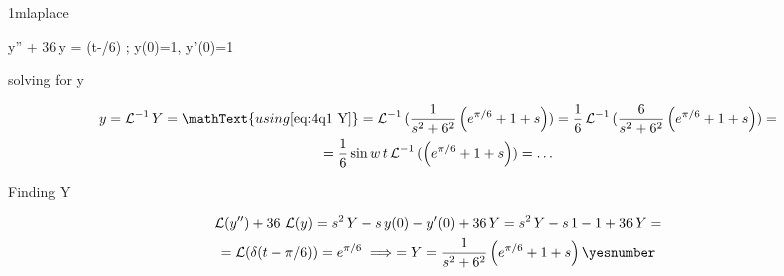\documentclass["AM3C-tests_resolutions.tex"]{subfiles}
\begin{document}
\setcounter{group}{3}
\group{}

\begin{questionBox}1m{laplace} %
  \begin{BM}
    y'' + 36\,y = \delta(t-\pi/6)
    ; y(0)=1, y'(0)=1
  \end{BM}
  \answer{}

  solving for y
  \begin{tcolorbox}
    \begin{gather*}
      y = \Lapl^{-1}{Y}
      = \mathText{using \eqref{eq:4q1 Y}}
      = \Lapl^{-1}{(
          \frac{1}{s^2+6^2}
          \left(
            e^{\pi/6} + 1 +s
          \right)
      )}
      = \frac{1}{6}
      \Lapl^{-1}{(
          \frac{6}{s^2+6^2}
          \left(
            e^{\pi/6} + 1 +s
          \right)
      )}
      = \\
      = \frac{1}{6}
      \sin{w\,t}
      \Lapl^{-1}{(
          \left(
            e^{\pi/6} + 1 +s
          \right)
      )}
      = \dots
    \end{gather*}
  \end{tcolorbox}

  Finding Y
  \begin{tcolorbox}
    \begin{gather*}
      \Lapl(y'') + 36\,\Lapl(y)
      = s^2\,Y - s\,y(0) - y'(0)
      + 36\,Y
      = s^2\,Y - s\,1 - 1
      + 36\,Y
      = \\
      = \Lapl(\delta(t-\pi/6))
      = e^{\pi/6}
      \implies 
      = Y 
      = \frac{1}{s^2+6^2}
      \left(
        e^{\pi/6} + 1 +s
      \right)
      \yesnumber\label{eq:4q1 Y}
    \end{gather*}
  \end{tcolorbox}

\end{questionBox}
\end{document}
